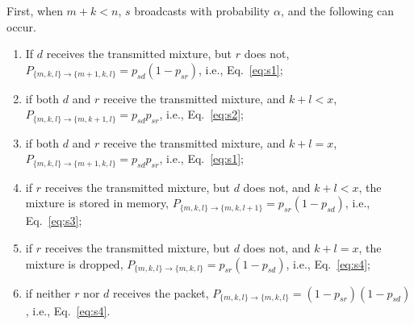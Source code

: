 \documentclass[journal, letterpaper]{IEEEtran}
\begin{document}
First, when $m+k < n$, $s$ broadcasts with probability $\alpha$, and the following can occur.

\begin{enumerate}
    \item If $d$ receives the transmitted mixture, but $r$ does not, $P_{\{m,k,l\}\rightarrow\{m+1,k,l\}} = p_{sd}(1-p_{sr})$, i.e., Eq.~\eqref{eq:s1};
    \item if both $d$ and $r$ receive the transmitted mixture, and $k+l<x$, $P_{\{m,k,l\}\rightarrow\{m,k+1,l\}} =  p_{sd}p_{sr}$, i.e., Eq.~\eqref{eq:s2};
    \item if both $d$ and $r$ receive the transmitted mixture, and $k+l=x$, $P_{\{m,k,l\}\rightarrow\{m+1,k,l\}} =  p_{sd}p_{sr}$, i.e., Eq.~\eqref{eq:s1};
    \item if $r$ receives the transmitted mixture, but $d$ does not, and $k+l<x$, the mixture is stored in memory, $P_{\{m,k,l\}\rightarrow\{m,k,l+1\}} = p_{sr}(1-p_{sd})$, i.e., Eq.~\eqref{eq:s3};
    \item if $r$ receives the transmitted mixture, but $d$ does not, and $k+l=x$, the mixture is dropped, $P_{\{m,k,l\}\rightarrow\{m,k,l\}} = p_{sr}(1-p_{sd})$, i.e., Eq.~\eqref{eq:s4};
    \item if neither $r$ nor $d$ receives the packet, $P_{\{m,k,l\}\rightarrow\{m,k,l\}} = (1-p_{sr})(1-p_{sd})$, i.e., Eq.~\eqref{eq:s4}.
\end{enumerate}
\end{document}
